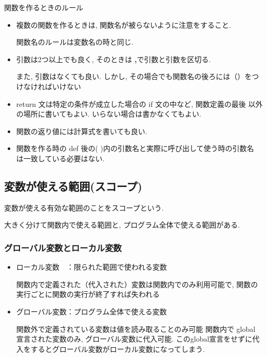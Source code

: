 \documentclass{jsarticle}
\begin{document}
\begin{itembox}[l]{関数を作るときのルール}
	\begin{itemize}
		\item{複数の関数を作るときは, 関数名が被らないように注意をすること. \par
		            関数名のルールは変数名の時と同じ. }
		\item{引数は2つ以上でも良く, そのときは {\textbf {,}}で引数と引数を区切る. \par
		また, 引数はなくても良い. しかし, その場合でも関数名の後ろには（）をつけなければいけない}
		\item{return 文は特定の条件が成立した場合の if 文の中など, 関数定義の最後
		            以外の場所に書いてもよい. いらない場合は書かなくてもよい. }
		\item{関数の返り値には計算式を書いても良い.  \par}
		\item{関数を作る時の def 後の( )内の引数名と実際に呼び出して使う時の引数名
		            は一致している必要はない. }
	\end{itemize}
\end{itembox}

\newpage

\subsection{変数が使える範囲(スコープ)}
変数が使える有効な範囲のことをスコープという.  \par
大きく分けて関数内で使える範囲と, プログラム全体で使える範囲がある.
\subsubsection{グローバル変数とローカル変数}
\begin{itemize}
	\item {ローカル変数　：限られた範囲で使われる変数} \par
	      関数内で定義された（代入された）変数は関数内でのみ利用可能で, 関数の実行ごとに関数の実行が終了すれば失われる

	\item {グローバル変数：プログラム全体で使える変数} \par
	      関数外で定義されている変数は値を読み取ることのみ可能
	      関数内で global 宣言された変数のみ, グローバル変数に代入可能.
	      このglobal宣言をせずに代入をするとグローバル変数がローカル変数になってしまう.
\end{itemize}
\end{document}
